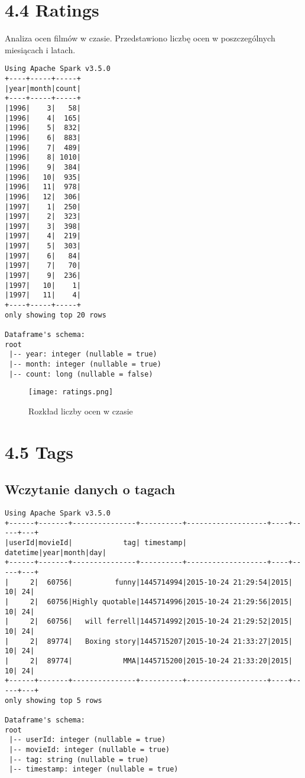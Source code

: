 \documentclass{article}
\begin{document}
\section{4.4 Ratings}
Analiza ocen filmów w czasie. Przedstawiono liczbę ocen w poszczególnych miesiącach i latach.

\begin{verbatim}
Using Apache Spark v3.5.0
+----+-----+-----+
|year|month|count|
+----+-----+-----+
|1996|    3|   58|
|1996|    4|  165|
|1996|    5|  832|
|1996|    6|  883|
|1996|    7|  489|
|1996|    8| 1010|
|1996|    9|  384|
|1996|   10|  935|
|1996|   11|  978|
|1996|   12|  306|
|1997|    1|  250|
|1997|    2|  323|
|1997|    3|  398|
|1997|    4|  219|
|1997|    5|  303|
|1997|    6|   84|
|1997|    7|   70|
|1997|    9|  236|
|1997|   10|    1|
|1997|   11|    4|
+----+-----+-----+
only showing top 20 rows

Dataframe's schema:
root
 |-- year: integer (nullable = true)
 |-- month: integer (nullable = true)
 |-- count: long (nullable = false)
\end{verbatim}

\begin{figure}[H]
    \centering
    \texttt{[image: ratings.png]}
    \caption{Rozkład liczby ocen w czasie}
    \label{fig:ratings_distribution}
\end{figure}

\section{4.5 Tags}
\subsection{Wczytanie danych o tagach}
\begin{verbatim}
Using Apache Spark v3.5.0
+------+-------+---------------+----------+-------------------+----+-----+---+
|userId|movieId|            tag| timestamp|           datetime|year|month|day|
+------+-------+---------------+----------+-------------------+----+-----+---+
|     2|  60756|          funny|1445714994|2015-10-24 21:29:54|2015|   10| 24|
|     2|  60756|Highly quotable|1445714996|2015-10-24 21:29:56|2015|   10| 24|
|     2|  60756|   will ferrell|1445714992|2015-10-24 21:29:52|2015|   10| 24|
|     2|  89774|   Boxing story|1445715207|2015-10-24 21:33:27|2015|   10| 24|
|     2|  89774|            MMA|1445715200|2015-10-24 21:33:20|2015|   10| 24|
+------+-------+---------------+----------+-------------------+----+-----+---+
only showing top 5 rows

Dataframe's schema:
root
 |-- userId: integer (nullable = true)
 |-- movieId: integer (nullable = true)
 |-- tag: string (nullable = true)
 |-- timestamp: integer (nullable = true)
\end{verbatim}
\end{document}
